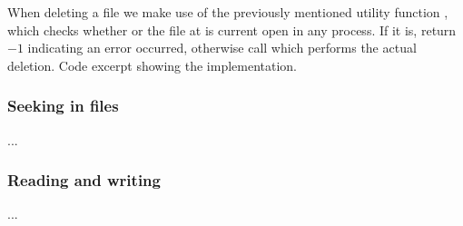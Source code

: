 When deleting a file we make use of the previously mentioned utility function
, which checks whether or the file at
 is current open in any process. If it is, return $-1$
indicating an error occurred, otherwise call  which performs
the actual deletion.
{Code excerpt showing the  implementation.}

\subsubsection{Seeking in files}
...

\subsubsection{Reading and writing}
...

